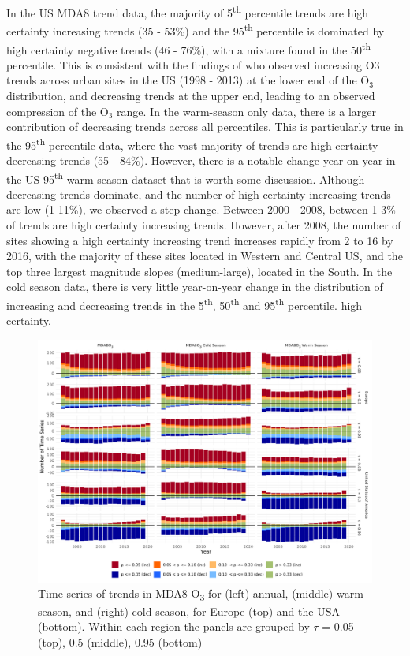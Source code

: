 \documentclass[journal abbreviation, manuscript]{copernicus}
\begin{document}
In the US MDA8 trend data, the majority of 5\textsuperscript{th} percentile trends are high certainty increasing trends (35 - 53\%) and the 95\textsuperscript{th} percentile is dominated by high certainty negative trends (46 - 76\%), with a mixture found in the 50\textsuperscript{th} percentile. This is consistent with the findings of \cite{Simon_2015} who observed increasing O3 trends across urban sites in the US (1998 - 2013) at the lower end of the O$_3$ distribution, and decreasing trends at the upper end, leading to an observed compression of the O$_3$ range. In the warm-season only data, there is a larger contribution of decreasing trends across all percentiles. This is particularly true in the 95\textsuperscript{th} percentile data, where the vast majority of trends are high certainty decreasing trends (55 - 84\%). However, there is a notable change year-on-year in the US 95\textsuperscript{th} warm-season dataset that is worth some discussion. Although decreasing trends dominate, and the number of high certainty increasing trends are low (1-11\%), we observed a step-change. Between 2000 - 2008, between 1-3\% of trends are high certainty increasing trends. However, after 2008, the number of sites showing a high certainty increasing trend increases rapidly from 2 to 16 by 2016, with the majority of these sites located in Western and Central US, and the top three largest magnitude slopes (medium-large), located in the South. In the cold season data, there is very little year-on-year change in the distribution of increasing and decreasing trends in the 5\textsuperscript{th}, 50\textsuperscript{th} and 95\textsuperscript{th} percentile. high certainty.

\begin{figure}[h!]
\centering
\includegraphics[width=\textwidth]{figures/paper_figures/signifcance_bars.pdf}
\caption{Time series of trends in MDA8 O\textsubscript{3} for (left) annual, (middle) warm season, and (right) cold season, for Europe (top) and the USA (bottom). Within each region the panels are grouped by $\tau$ = 0.05 (top), 0.5 (middle), 0.95 (bottom)}
\label{fig:p_bar_year_mda8_anom_combined}
\end{figure}
\end{document}
